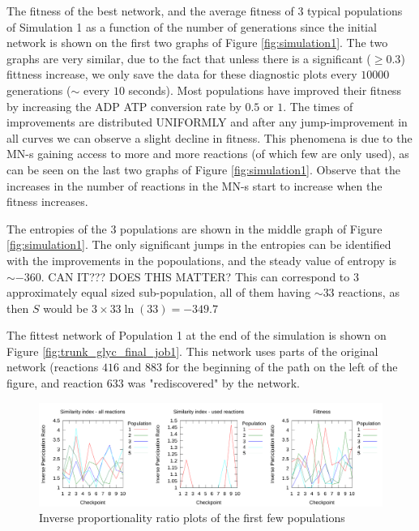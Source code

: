 \documentclass[10pt,a4paper]{article}
\begin{document}
The fitness of the best network, and the average fitness of $3$ typical populations of Simulation 1 as a function of the number of generations since the initial network is shown on the first two graphs of Figure \ref{fig:simulation1}. The two graphs are very similar, due to the fact that unless there is a significant ($\geq 0.3$) fittness increase, we only save the data for these diagnostic plots every $10000$ generations ($\sim$ every $10$ seconds). Most populations have improved their fitness by increasing the ADP ATP conversion rate by $0.5$ or $1$. The times of improvements are distributed UNIFORMLY and after any jump-improvement in all curves we can observe a slight decline in fitness. This phenomena is due to the MN-s gaining access to more and more reactions (of which few are only used), as can be seen on the last two graphs of Figure \ref{fig:simulation1}. Observe that the increases in the number of reactions in the MN-s start to increase when the fitness increases. 


The entropies of the $3$ populations are shown in the middle graph of Figure \ref{fig:simulation1}. The only significant jumps in the entropies can be identified with the improvements in the popoulations, and the steady value of entropy is $\sim -360$. CAN IT??? DOES THIS MATTER? This can correspond to $3$ approximately equal sized sub-population, all of them having $\sim 33$ reactions, as then $S$ would be $3\times 33 \ln \left( 33 \right)=-349.7$

The fittest network of Population 1 at the end of the simulation is shown on Figure \ref{fig:trunk_glyc_final_job1}. This network uses parts of the original network (reactions $416$ and $883$ for the beginning of the path on the left of the figure, and reaction $633$ was "rediscovered" by the network. 

\begin{figure}[htpb]
	\centering
	\includegraphics[width=1\linewidth]{IPR_longerlog.pdf}
	\caption{Inverse proportionality ratio plots of the first few populations}
	\label{fig:IPR_firstrun}
\end{figure}
\end{document}
